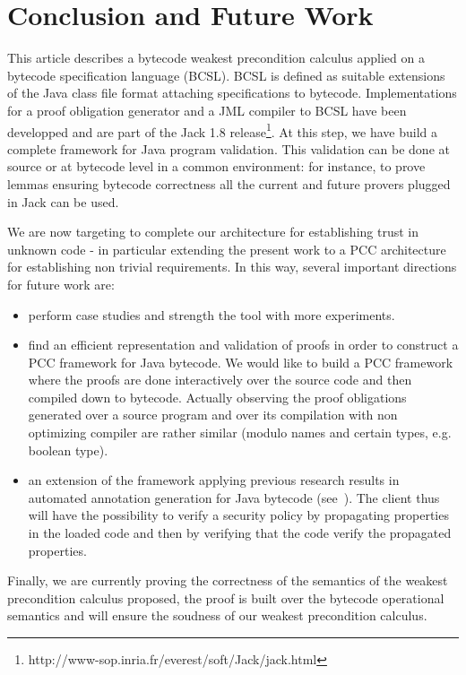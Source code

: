 \section{Conclusion and Future Work}\label{conclusion}
This article describes a bytecode weakest precondition calculus applied on a bytecode specification language (BCSL).
BCSL is defined as suitable extensions of the Java class file format attaching specifications to bytecode.
Implementations for a proof obligation generator and a JML compiler to BCSL have been developped and are part of the Jack 1.8 release\footnote{http://www-sop.inria.fr/everest/soft/Jack/jack.html}.
At this step, we have build a complete framework for Java program validation. This validation can be done at source or at bytecode level in a common environment: for instance, to prove lemmas ensuring bytecode correctness all the current and future provers plugged in Jack can be used.

We are now targeting to complete our architecture for establishing trust in unknown code - in particular extending the present work to a PCC architecture for establishing non trivial requirements.  
In this way, several important directions for future work are:
\begin{itemize}
\item perform case studies and strength the tool with more experiments.
\item find an efficient representation and validation of proofs in order to construct a PCC framework for Java bytecode. We would like to build a PCC framework where the proofs are done interactively over the source code
and then compiled down to bytecode. Actually observing the proof obligations generated over a source program and over its compilation with non optimizing compiler are
rather similar (modulo names and certain types, e.g. boolean type).
\item an extension of the framework applying previous research results in automated annotation generation for Java bytecode (see~\cite{PBBHL}). The client thus will have the possibility to verify a security policy by propagating properties in the loaded code and then by verifying that the code verify the propagated properties.

\end{itemize}
Finally, we are currently proving the correctness of the semantics of the weakest precondition calculus proposed, the proof is built over the bytecode operational semantics and will ensure the soudness of our weakest precondition calculus.

